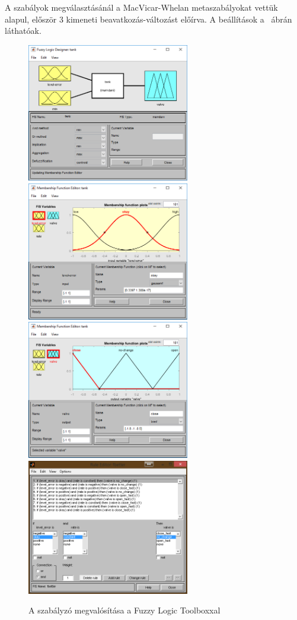 A szabályok megválasztásánál a MacVicar-Whelan metaszabályokat vettük alapul, először 3 kimeneti beavatkozás-változást előírva. A beállítások a ~ábrán láthatóak.

\begin{figure}[!h]
	\centering
	\includegraphics[width=71mm, keepaspectratio]{figures/m01/fuzzy1.png}\hspace{5mm}
	\includegraphics[width=71mm, keepaspectratio]{figures/m01/fuzzy2.png}\\\vspace{2.5mm}
	\includegraphics[width=71mm, keepaspectratio]{figures/m01/fuzzy3.png}\hspace{5mm}
	\includegraphics[width=71mm, keepaspectratio]{figures/m01/rules.png}
	\caption{A szabályzó megvalósítása a Fuzzy Logic Toolboxxal} 
	\label{fig:FirstFuzzy}
\end{figure}

